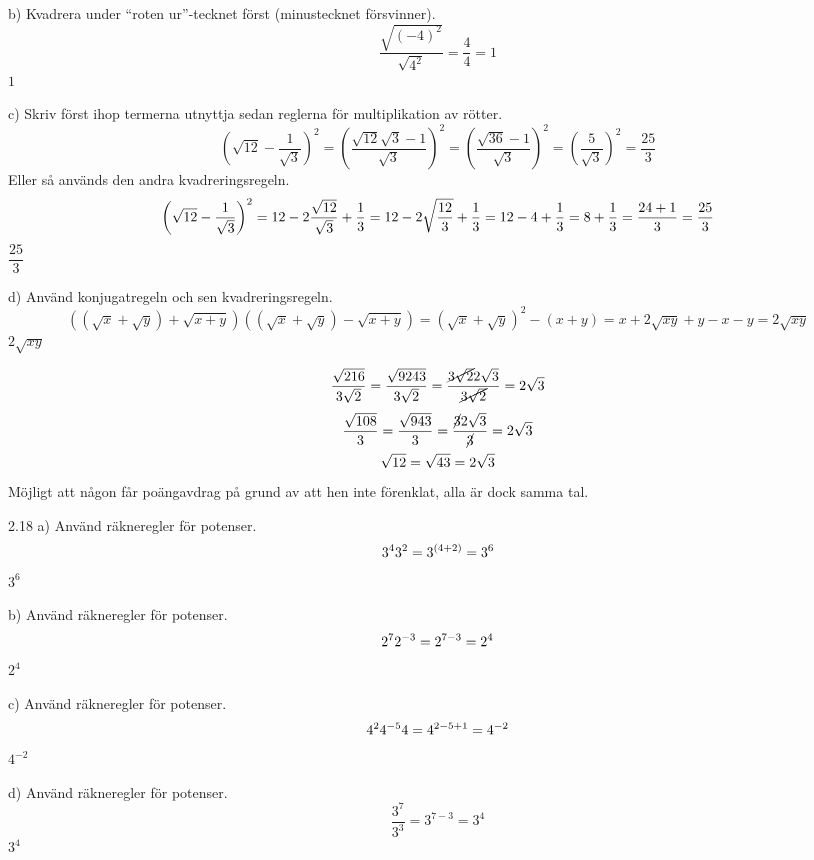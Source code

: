 \begin{task}{b)}
	Kvadrera under ``roten ur''-tecknet först (minustecknet försvinner). 
	\[\dfrac{\sqrt{(-4)^2}}{\sqrt{4^2}}=
	\dfrac{4}{4}=
	1\]
	\ans $1$
\end{task}

\begin{task}{c)}
	Skriv först ihop termerna utnyttja sedan reglerna för multiplikation av rötter.
	\[\left(\sqrt{12}-\frac{1}{\sqrt{3}}\right)^2=
	\left(\frac{\sqrt{12}\sqrt{3}-1}{\sqrt{3}}\right)^2=
	\left(\frac{\sqrt{36}-1}{\sqrt{3}}\right)^2=
	\left(\frac{5}{\sqrt{3}}\right)^2=
	\frac{25}{3}\]
	Eller så används den andra kvadreringsregeln.
	\[\left(\sqrt{12}-\frac{1}{\sqrt{3}}\right)^2=
	12-2\*\dfrac{\sqrt{12}}{\sqrt{3}}+\dfrac{1}{3}=
	12-2\*\sqrt{\dfrac{12}{3}}+\dfrac{1}{3}=
	12-4+\dfrac{1}{3}=
	8+\dfrac{1}{3}=
	\dfrac{24+1}{3}=
	\dfrac{25}{3}\]
	\ans $\dfrac{25}{3}$
\end{task}

\begin{task}{d)}
	Använd konjugatregeln och sen kvadreringsregeln.
	\[((\sqrt{x}+\sqrt{y})+\sqrt{x+y})((\sqrt{x}+\sqrt{y})-\sqrt{x+y})=
	(\sqrt{x}+\sqrt{y})^2-(x+y)=
	x+2\sqrt{xy}+y-x-y=
	2\sqrt{xy}\]
	\ans $2\sqrt{xy}$
\end{task}

\begin{task}{2.17}
	\[\dfrac{\sqrt{216}}{3\sqrt{2}}=
	\dfrac{\sqrt{9\*2\*4\*3}}{3\sqrt{2}}=
	\dfrac{\cancel{3\sqrt{2}}\*2\sqrt{3}}{\cancel{3\sqrt{2}}}=
	2\sqrt{3}\]
	\[\dfrac{\sqrt{108}}{3}=
	\dfrac{\sqrt{9\*4\*3}}{3}=
	\dfrac{\cancel{3}\*2\sqrt{3}}{\cancel{3}}=
	2\sqrt{3}\]
	\[\sqrt{12}=\sqrt{4\*3}=2\sqrt{3}\]
	\ans Möjligt att någon får poängavdrag på grund av att hen inte förenklat, alla är dock samma tal.
\end{task}

\begin{task}{2.18 a)}
	Använd räkneregler för potenser.
	\[3^4\*3^2=3^{(4+2)}=3^6\]
	\ans $3^6$
\end{task}

\begin{task}{b)}
	Använd räkneregler för potenser.
	\[2^7\*2^{-3}=2^{7-3}=2^4\]
	\ans $2^4$
\end{task}

\begin{task}{c)}
	Använd räkneregler för potenser.
	\[4^2\*4^{-5}\*4=4^{2-5+1}=4^{-2}\]
	\ans $4^{-2}$
\end{task}

\begin{task}{d)}
	Använd räkneregler för potenser.
	\[\dfrac{3^7}{3^3}=3^{7-3}=3^4\]
	\ans $3^4$
\end{task}


